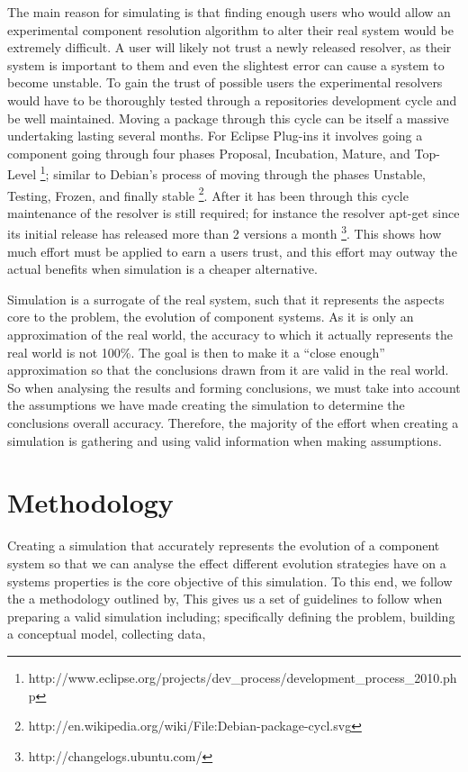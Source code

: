 The main reason for simulating is that finding enough users
who would allow an experimental component resolution algorithm to alter their real system would be extremely difficult.
A user will likely not trust a newly released resolver, as their system is important to them and even the slightest error can cause
a system to become unstable. 
To gain the trust of possible users the experimental resolvers would have to be thoroughly tested through a repositories development cycle and be well maintained.
Moving a package through this cycle can be itself a massive undertaking lasting several months. 
For Eclipse Plug-ins it involves going a component going through four phases 
Proposal, Incubation, Mature, and Top-Level \footnote{http://www.eclipse.org/projects/dev\_process/development\_process\_2010.php};
similar to Debian's process of moving through the phases Unstable, Testing, Frozen, and finally stable \footnote{http://en.wikipedia.org/wiki/File:Debian-package-cycl.svg}.
After it has been through this cycle maintenance of the resolver is still required; 
for instance the resolver apt-get since its initial release has released more than 2 versions a month \footnote{http://changelogs.ubuntu.com/}.
This shows how much effort must be applied to earn a users trust, and this effort may outway the actual benefits when simulation is a cheaper alternative.

Simulation is a surrogate of the real system, such that it represents the aspects core to the problem, 
the evolution of component systems.
As it is only an approximation of the real world, 
the accuracy to which it actually represents the real world is not 100\%.
The goal is then to make it a ``close enough'' approximation so that the conclusions drawn from it are valid in the real world.
So when analysing the results and forming conclusions, we must take into account the assumptions we have made creating the simulation to determine 
the conclusions overall accuracy.
Therefore, the majority of the effort when creating a simulation is gathering and using valid information when making assumptions.

\section{Methodology}
Creating a simulation that accurately represents the evolution of a component system so that we can 
analyse the effect different evolution strategies have on a systems properties is the core objective of this simulation.
To this end, we follow the a methodology outlined by, %
This gives us a set of guidelines to follow when preparing a valid simulation including;
specifically defining the problem,
building a conceptual model,
collecting data,

